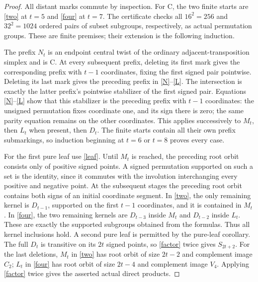 \documentclass[11pt]{article}
\begin{document}
\begin{proof}
All distant marks commute by inspection. For C, the two finite starts
are \eqref{two} at $t=5$ and \eqref{four} at $t=7$. The certificate
checks all $16^2=256$ and $32^2=1024$ ordered pairs of subset
subgroups, respectively, as actual permutation groups. These are
finite premises; their extension is the following induction.

The prefix $N_t$ is an endpoint central twist of the ordinary
adjacent-transposition simplex and is C. At every subsequent prefix,
deleting its first mark gives the corresponding prefix with $t-1$
coordinates, fixing the first signed pair pointwise. Deleting its
last mark gives the preceding prefix in \eqref{N}--\eqref{L}.
The intersection is exactly the latter prefix's pointwise stabilizer
of the first signed pair. Equations \eqref{N}--\eqref{L} show that
this stabilizer is the preceding prefix with $t-1$ coordinates:
the unsigned permutation fixes coordinate one, and its sign there
is zero; the same parity equation remains on the other coordinates.
This applies successively to $M_t$, then $L_t$ when present, then
$D_t$. The finite starts contain all their own prefix submarkings,
so induction beginning at $t=6$ or $t=8$ proves every case.

For the first pure leaf use \eqref{leaf}. Until $M_t$ is reached,
the preceding root orbit consists only of positive signed points.
A signed permutation supported on such a set is the identity, since
it commutes with the involution interchanging every positive and
negative point. At the subsequent stages the preceding root orbit
contains both signs of an initial coordinate segment. In
\eqref{two}, the only remaining kernel is $D_{t-1}$, supported
on the first $t-1$ coordinates, and it is contained in $M_t$.
In \eqref{four}, the two remaining kernels are $D_{t-3}$ inside
$M_t$ and $D_{t-2}$ inside $L_t$. These are exactly the supported
subgroups obtained from the formulas. Thus all kernel inclusions
hold. A second pure leaf is permitted by the pure-leaf corollary.
The full $D_t$ is transitive on its $2t$ signed points, so
\eqref{factor} twice gives $S_{2t+2}$. For the last deletions,
$M_t$ in \eqref{two} has root orbit of size $2t-2$ and complement
image $C_2$; $L_t$ in \eqref{four} has root orbit of size $2t-4$
and complement image $V_4$. Applying \eqref{factor} twice gives
the asserted actual direct products.
\end{proof}
\end{document}
